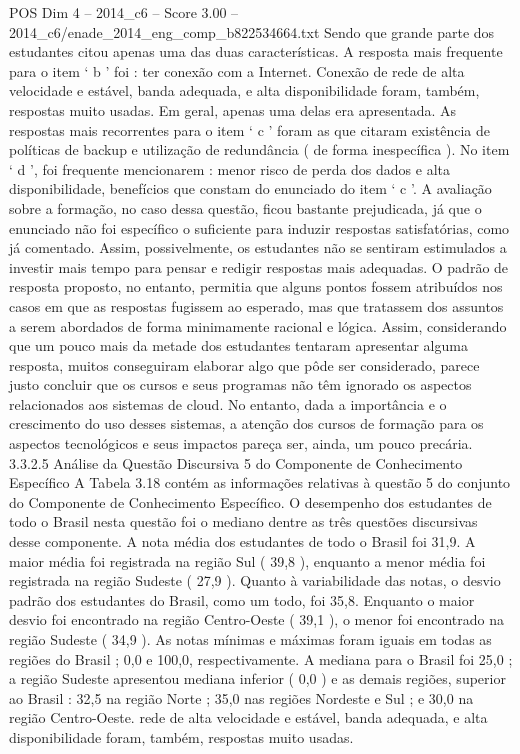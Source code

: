 \begin{textsample}{POS Dim 4 – 2014\_c6 – Score 3.00 – 2014\_c6/enade\_2014\_eng\_comp\_b822534664.txt}
Sendo que grande parte dos estudantes citou apenas uma das duas características.
A resposta mais frequente para o item ‘ b ’ foi : ter conexão com a Internet.
Conexão de rede de alta velocidade e estável, banda adequada, e alta disponibilidade foram, também, respostas muito usadas.
Em geral, apenas uma delas era apresentada.
As respostas mais recorrentes para o item ‘ c ’ foram as que citaram existência de políticas de backup e utilização de redundância ( de forma inespecífica ).
No item ‘ d ’, foi frequente mencionarem : menor risco de perda dos dados e alta disponibilidade, benefícios que constam do enunciado do item ‘ c ’.
A avaliação sobre a formação, no caso dessa questão, ficou bastante prejudicada, já que o enunciado não foi específico o suficiente para induzir respostas satisfatórias, como já comentado.
Assim, possivelmente, os estudantes não se sentiram estimulados a investir mais tempo para pensar e redigir respostas mais adequadas.
O padrão de resposta proposto, no entanto, permitia que alguns pontos fossem atribuídos nos casos em que as respostas fugissem ao esperado, mas que tratassem dos assuntos a serem abordados de forma minimamente racional e lógica.
Assim, considerando que um pouco mais da metade dos estudantes tentaram apresentar alguma resposta, muitos conseguiram elaborar algo que pôde ser considerado, parece justo concluir que os cursos e seus programas não têm ignorado os aspectos relacionados aos sistemas de cloud.
No entanto, dada a importância e o crescimento do uso desses sistemas, a atenção dos cursos de formação para os aspectos tecnológicos e seus impactos pareça ser, ainda, um pouco precária. 3.3.2.5 Análise da Questão Discursiva 5 do Componente de Conhecimento Específico A Tabela 3.18 contém as informações relativas à questão 5 do conjunto do Componente de Conhecimento Específico.
O desempenho dos estudantes de todo o Brasil nesta questão foi o mediano dentre as três questões discursivas desse componente.
A nota média dos estudantes de todo o Brasil foi 31,9.
A maior média foi registrada na região Sul ( 39,8 ), enquanto a menor média foi registrada na região Sudeste ( 27,9 ).
Quanto à variabilidade das notas, o desvio padrão dos estudantes do Brasil, como um todo, foi 35,8.
Enquanto o maior desvio foi encontrado na região Centro-Oeste ( 39,1 ), o menor foi encontrado na região Sudeste ( 34,9 ).
As notas mínimas e máximas foram iguais em todas as regiões do Brasil ; 0,0 e 100,0, respectivamente.
A mediana para o Brasil foi 25,0 ; a região Sudeste apresentou mediana inferior ( 0,0 ) e as demais regiões, superior ao Brasil : 32,5 na região Norte ; 35,0 nas regiões Nordeste e Sul ; e 30,0 na região Centro-Oeste. rede de alta velocidade e estável, banda adequada, e alta disponibilidade foram, também, respostas muito usadas.

\end{textsample}
